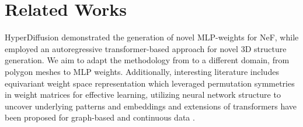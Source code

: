 \section{Related Works}
\label{sec:literature}



HyperDiffusion \cite{erkoç2023hyperdiffusion} demonstrated the generation of novel MLP-weights for NeF, while \cite{siddiqui2023meshgpt} employed an autoregressive transformer-based approach for novel 3D structure generation. We aim to adapt the methodology from \cite{siddiqui2023meshgpt} to a different domain, from polygon meshes to MLP weights.
Additionally, interesting literature includes equivariant weight space representation\cite{navon2023equivariant, navon2024equivariant} which leveraged permutation symmetries in weight matrices for effective learning, utilizing neural network structure to uncover underlying patterns and embeddings \cite{lim2023graph,andreis2023setbased} and extensions of transformers have been proposed for graph-based \cite{diao2023relational} and continuous data \cite{born2023regression,mao2022poseur}.